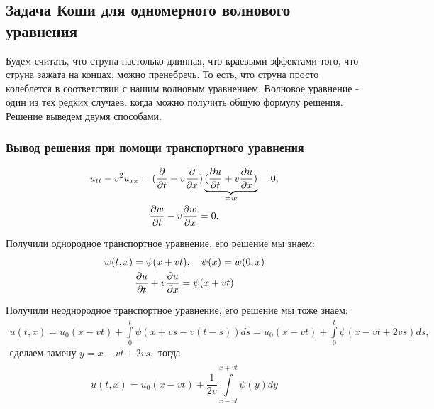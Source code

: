 
\subsection{Задача Коши для одномерного волнового уравнения}
Будем считать, что струна настолько длинная, что краевыми эффектами того, что струна зажата на концах, можно пренебречь. То есть, что струна просто колеблется в соответствии с нашим волновым уравнением. Волновое уравнение - один из тех редких случаев, когда можно получить общую формулу решения.
Решение выведем двумя способами.
\subsubsection{Вывод решения при помощи транспортного уравнения}
\begin{gather*}
	u_{tt} - v^2 u_{xx} = (\pder{t} - v \pder{x}) \underbrace {(\pder[u]{t} + v \pder[u]{x})}_{= w} = 0, \\
 	\pder[w]{t} - v \pder[w]{x} = 0.
\end{gather*}

Получили однородное транспортное уравнение, его решение мы знаем:
\begin{gather*}
	w(t,x) = \psi (x + vt),\quad \psi (x) = w(0,x) \\
	\pder[u]{t} + v \pder[u]{x} = \psi (x + vt)		
\end{gather*}

Получили неоднородное транспортное уравнение, его решение мы тоже знаем:
\begin{gather*}
	u(t,x) = u_0 (x - vt) + \int \limits_0^t \psi(x + vs - v(t-s)) ds = u_0 (x - vt) + \int \limits_0^t \psi (x - vt + 2vs) ds, \\
	\text{сделаем замену }y = x - vt + 2vs, \text{ тогда} \\
\end{gather*}
\begin{equation}
    u(t,x) = u_0 (x - vt) + \frac {1} {2v} \int \limits_{x-vt}^{x+vt} \psi (y) dy
\label{wavehomans}
\end{equation}

